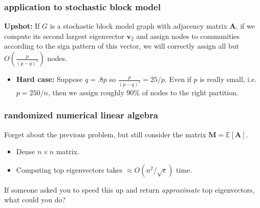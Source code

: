 \documentclass[compress]{beamer}
\newcommand{\bv}[1]{\mathbf{#1}}
\newcommand{\E}{\mathbb{E}}
\begin{document}

\begin{frame}
	\frametitle{application to stochastic block model}
	\textbf{Upshot:} If $G$ is a stochastic block model graph with adjacency matrix $\bv{A}$, if we compute its second largest eigenvector $\bv{v}_2$ and assign nodes to communities according to the sign pattern of this vector, we will correctly assign all but $O \left  (\frac{p}{(p-q)^2} \right  )$ nodes.
	\begin{itemize}
		\item \textbf{Hard case:} Suppose $q = .8  p$ so $\frac{p}{(p-q)^2} = 25/p$. Even if $p$ is really small, i.e. $p = 250/n$, then we assign roughly $90\%$ of nodes to the right partition.
	\end{itemize}
\end{frame}

\begin{frame}[t]
	\frametitle{randomized numerical linear algebra}
	Forget about the previous problem, but still consider the matrix $\bv{M} = \E[\bv{A}]$.
	\begin{itemize}
		\item Dense $n \times n$ matrix.
		\item Computing top eigenvectors takes $\approx O(n^2 / \sqrt{\epsilon})$ time.
	\end{itemize}
	If someone asked you to speed this up and return \emph{approximate} top eigenvectors, what could you do?
\end{frame}
\end{document}
